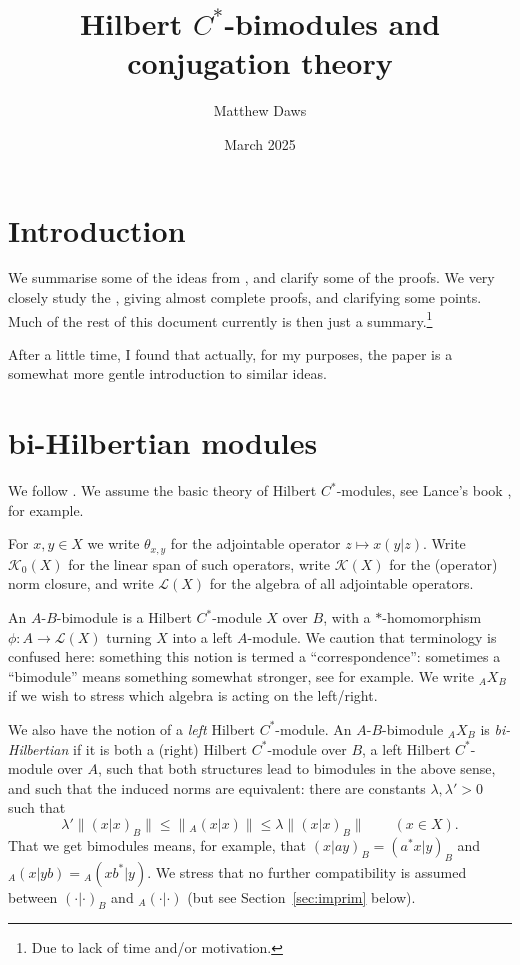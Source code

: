 \documentclass[a4paper,11pt]{article}
\theoremstyle{plain}
\theoremstyle{remark}
\newcommand{\mc}[1]{\mathcal{#1}}
\begin{document}
\title{Hilbert $C^*$-bimodules and conjugation theory}
\author{Matthew Daws}
\date{March 2025}
\maketitle

\section{Introduction}

We summarise some of the ideas from \cite{KPW_JonesIndexTheory}, and clarify some of the proofs.
We very closely study the \cite[Section~2]{KPW_JonesIndexTheory}, giving almost complete proofs, and clarifying some points.  Much of the rest of this document currently is then just a summary.\footnote{Due to lack of time and/or motivation.}

After a little time, I found that actually, for my purposes, the paper \cite{KW_JonesIndexBimods} is a somewhat more gentle introduction to similar ideas.




\section{bi-Hilbertian modules}

We follow \cite[Section~2]{KPW_JonesIndexTheory}.  We assume the basic theory of Hilbert $C^*$-modules, see Lance's book \cite{Lance_HilbModsBook}, for example.  

For $x,y\in X$ we write $\theta_{x,y}$ for the adjointable operator $z \mapsto x (y|z)$.  Write $\mc K_0(X)$ for the linear span of such operators, write $\mc K(X)$ for the (operator) norm closure, and write $\mc L(X)$ for the algebra of all adjointable operators.

An $A$-$B$-bimodule is a Hilbert $C^*$-module $X$ over $B$, with a $*$-homomorphism $\phi \colon A \to \mc L(X)$ turning $X$ into a left $A$-module.  We caution that terminology is confused here: something this notion is termed a ``correspondence'': sometimes a ``bimodule'' means something somewhat stronger, see \cite[Section~1.5]{MT_HilbertCStarModBook} for example.  We write ${}_A X_B$ if we wish to stress which algebra is acting on the left/right.

We also have the notion of a \emph{left} Hilbert $C^*$-module.  An $A$-$B$-bimodule ${}_A X_B$ is \emph{bi-Hilbertian} if it is both a (right) Hilbert $C^*$-module over $B$, a left Hilbert $C^*$-module over $A$, such that both structures lead to bimodules in the above sense, and such that the induced norms are equivalent: there are constants $\lambda, \lambda'>0$ such that
\[ \lambda' \|(x|x)_B\| \leq \|{}_A(x|x)\| \leq \lambda \|(x|x)_B\|
\qquad (x\in X). \]
That we get bimodules means, for example, that $(x|ay)_B = (a^*x|y)_B$ and ${}_A(x|yb) = {}_A(xb^*|y)$.  We stress that no further compatibility is assumed between $(\cdot|\cdot)_B$ and ${}_A(\cdot|\cdot)$ (but see Section~\ref{sec:imprim} below).
\end{document}
